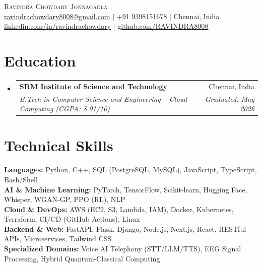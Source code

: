 \documentclass[letterpaper,10pt]{article}
\makeatletter
\newcommand{\resumeSubheading}[4]{
  \vspace{-1pt}\item
    \begin{tabular*}{0.98\textwidth}[t]{l@{\extracolsep{\fill}}r}
      \textbf{#1} & \small #2 \\
      \textit{\small#3} & \textit{\small #4} \\
    \end{tabular*}\vspace{-4pt}
}
\newcommand{\resumeSubHeadingListStart}{\begin{itemize}[leftmargin=0.0in, label={}]}
\newcommand{\resumeSubHeadingListEnd}{\end{itemize}\vspace{-2pt}}
\makeatother
\begin{document}
\begin{center}
    {\Huge \scshape Ravindra Chowdary Jonnagadla} \\ \vspace{3pt}
    \small 
    \href{mailto:ravindrachowdary8008@gmail.com}{\underline{ravindrachowdary8008@gmail.com}} $|$ 
    +91 9398151678 $|$ 
    Chennai, India \\ \vspace{2pt}
    \href{https://linkedin.com/in/ravindrachowdary}{\underline{linkedin.com/in/ravindrachowdary}} $|$ 
    \href{https://github.com/RAVINDRA8008}{\underline{github.com/RAVINDRA8008}}
\end{center}
\vspace{-8pt}

\section{Education}
  \resumeSubHeadingListStart
    \resumeSubheading
      {SRM Institute of Science and Technology}{Chennai, India}
      {B.Tech in Computer Science and Engineering -- Cloud Computing (CGPA: 8.01/10)}{Graduated: May 2026}
  \resumeSubHeadingListEnd
\vspace{-6pt}

\section{Technical Skills}
 \begin{itemize}[leftmargin=0.15in, label={}]
    \small{\item{
     \textbf{Languages:} Python, C++, SQL (PostgreSQL, MySQL), JavaScript, TypeScript, Bash/Shell \\ \vspace{1pt}
     \textbf{AI \& Machine Learning:} PyTorch, TensorFlow, Scikit-learn, Hugging Face, Whisper, WGAN-GP, PPO (RL), NLP \\ \vspace{1pt}
     \textbf{Cloud \& DevOps:} AWS (EC2, S3, Lambda, IAM), Docker, Kubernetes, Terraform, CI/CD (GitHub Actions), Linux \\ \vspace{1pt}
     \textbf{Backend \& Web:} FastAPI, Flask, Django, Node.js, Next.js, React, RESTful APIs, Microservices, Tailwind CSS \\ \vspace{1pt}
     \textbf{Specialized Domains:} Voice AI Telephony (STT/LLM/TTS), EEG Signal Processing, Hybrid Quantum-Classical Computing
    }}
 \end{itemize}
\vspace{-6pt}
\end{document}
